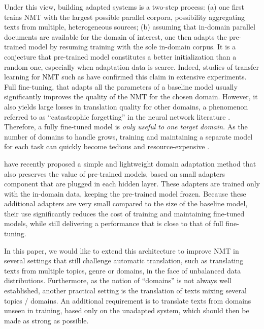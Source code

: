 \documentclass[11pt,a4paper]{article}
\newcommand{\fyDone}[1]{\done[FY]\Todo[FY:]{\textcolor{orange}{#1}}}
\begin{document}
Under this view, building adapted systems is a two-step process: (a) one first trains NMT with the largest possible parallel corpora, possibility aggregating texts from multiple, heterogeneous sources; (b) assuming that in-domain parallel documents are available for the domain of interest, one then adapts the pre-trained model by resuming training with the sole in-domain corpus. It is a conjecture that pre-trained model constitutes a better initialization than a random one, especially when adaptation data is scarce. Indeed, studies of transfer learning for NMT such as \cite{artetxe20cross,aji20neural} have confirmed this claim in extensive experiments. Full fine-tuning, that adapts all the parameters of a baseline model usually significantly improves the quality of the NMT for the chosen domain. However, it also yields large losses in translation quality for other domains, a phenomenon referred to as ``catastrophic forgetting'' in the neural network literature \cite{McCloskey89catastrophic}. Therefore, a fully fine-tuned model is \emph{only useful to one target domain}. As the number of domains to handle grows, training and maintaining a separate model for each task can quickly become tedious and resource-expensive .\fyDone{Fix this sentence.}

\cite{Vilar18learning,Bapna19simple} have recently proposed a simple and lightweight domain adaptation method that also preserves the value of pre-trained models, based on small adapters component that are plugged in each hidden layer. These adapters are trained only with the in-domain data, keeping the pre-trained model frozen. Because these additional adapters are very small compared to the size of the baseline model, their use significantly reduces the cost of training and maintaining fine-tuned models, while still delivering a performance that is close to that of full fine-tuning.

In this paper, we would like to extend this architecture to improve NMT in several settings that still challenge automatic translation, such as translating texts from multiple topics, genre or domains, in the face of unbalanced data distributions. Furthermore, as the notion of ``domains''  is not always well established, another practical setting is the translation of texts mixing several topics / domains. An additional requirement is to translate texts from domains unseen in training, based only on the unadapted system, which should then be made as strong as possible. 
\fyDone{Say differently: various implementations}
\end{document}
